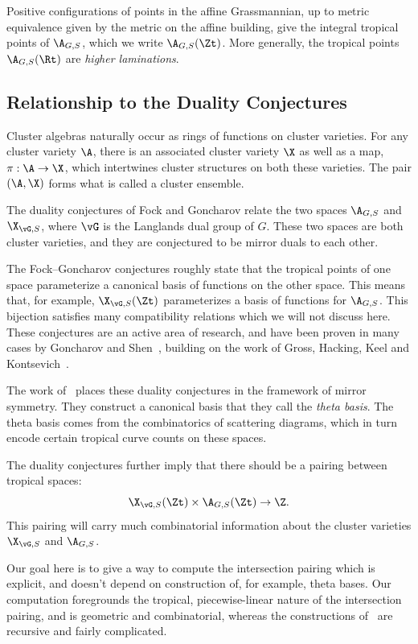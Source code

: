 Positive configurations of points in the affine Grassmannian, up to metric equivalence given by the metric on the affine building, give the integral tropical points of $\A_{G,S}$, which we write $\A_{G,S}(\Zt)$. More generally, the tropical points $\A_{G,S}(\Rt)$ are \emph{higher laminations}.

\subsection{Relationship to the Duality Conjectures}

Cluster algebras naturally occur as rings of functions on cluster varieties. For any cluster variety $\A$, there is an associated cluster variety $\X$ as well as a map, $\pi: \A \rightarrow \X$, which intertwines cluster structures on both these varieties. The pair $(\A,\X)$ forms what is called a cluster ensemble.

The duality conjectures of Fock and Goncharov relate the two spaces $\A_{G,S}$ and $\X_{\vG,S}$, where $\vG$ is the Langlands dual group of $G$. These two spaces are both cluster varieties, and they are conjectured to be mirror duals to each other.

The Fock--Goncharov conjectures roughly state that the tropical points of one space parameterize a canonical basis of functions on the other space. This means that, for example, $\X_{\vG,S}(\Zt)$ parameterizes a basis of functions for $\A_{G,S}$. This bijection satisfies many compatibility relations which we will not discuss here. These conjectures are an active area of research, and have been proven in many cases by Goncharov and Shen~\cite{GS2}, building on the work of Gross, Hacking, Keel and Kontsevich~\cite{GHKK}.

The work of~\cite{GHKK} places these duality conjectures in the framework of mirror symmetry. They construct a canonical basis that they call the \emph{theta basis}. The theta basis comes from the combinatorics of scattering diagrams, which in turn encode certain tropical curve counts on these spaces.

The duality conjectures further imply that there should be a pairing between tropical spaces:
\[
\X_{\vG,S}(\Zt) \times \A_{G,S}(\Zt) \rightarrow \Z.
\]
This pairing will carry much combinatorial information about the cluster varieties $\X_{\vG,S}$ and $\A_{G,S}$.

Our goal here is to give a way to compute the intersection pairing which is explicit, and doesn't depend on construction of, for example, theta bases. Our computation foregrounds the tropical, piecewise-linear nature of the intersection pairing, and is geometric and combinatorial, whereas the constructions of~\cite{GHKK} are recursive and fairly complicated.

